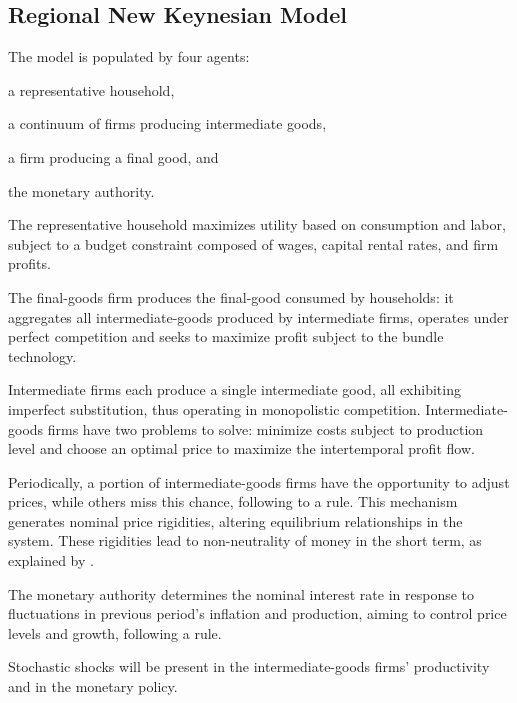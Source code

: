 \documentclass[
thesis.tex
]{subfiles}
\begin{document}
\newpage


\subsection{Regional New Keynesian Model}\label{sec:nk-model}

	The model is populated by four agents: 
	\begin{enumerate*}[label=(\arabic*)]
	\item a representative household,
	\item a continuum of firms producing intermediate goods,
	\item a firm producing a final good, and
	\item the monetary authority.
	\end{enumerate*}

	The representative household maximizes utility based on consumption and labor, subject to a budget constraint composed of wages, capital rental rates, and firm profits.
	
	The final-goods firm produces the final-good consumed by households: it aggregates all intermediate-goods produced by intermediate firms, operates under perfect competition and seeks to maximize profit subject to the bundle technology.
	
	Intermediate firms each produce a single intermediate good, all exhibiting imperfect substitution, thus operating in monopolistic competition. Intermediate-goods firms have two problems to solve: minimize costs subject to production level and choose an optimal price to maximize the intertemporal profit flow.
	
	Periodically, a portion of intermediate-goods firms have the opportunity to adjust prices, while others miss this chance, following to a \textcite{calvo_staggered_1983} rule. This mechanism generates nominal price rigidities, altering equilibrium relationships in the system. These rigidities lead to non-neutrality of money in the short term, as explained by \textcite[p.191]{costa_junior_understanding_2016}.
	
	The monetary authority determines the nominal interest rate in response to fluctuations in previous period's inflation and production, aiming to control price levels and growth, following a \textcite{taylor_discretion_1993} rule.
	
	Stochastic shocks will be present in the intermediate-goods firms' productivity and in the monetary policy.
	
\end{document}
